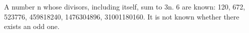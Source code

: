  A number n whose divisors, including itself, sum to 3n.
6 are known: 120, 672, 523776, 459818240,
1476304896, 31001180160. It is not known whether there
exists an odd one.
